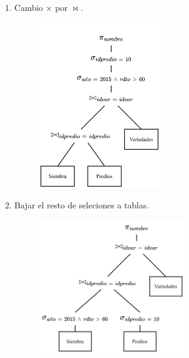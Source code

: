 \documentclass{templateNote}
\begin{document}
\begin{enumerate}
\begin{itemize}
\begin{enumerate}
            \item Cambio $\times$ por $\Join$.
            \begin{figure}[H]
                \centering
                \includegraphics[width=0.5\textwidth]{img/E1-Paso-4.png}
            \end{figure}

            \item Bajar el resto de seleciones a tablas.
            \begin{figure}[H]
                \centering
                \includegraphics[width=0.6\textwidth]{img/E1-Paso-5.png}
            \end{figure}


\end{enumerate}
\end{itemize}
\end{enumerate}
\end{document}
